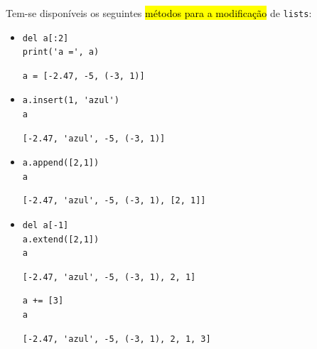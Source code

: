 Tem-se disponíveis os seguintes \hl{métodos para a modificação} de \texttt{lists}:
\begin{itemize}
\item {\PYTHONdel} 

\begin{lstlisting}[xrightmargin=2.5em]
del a[:2]
print('a =', a)
\end{lstlisting}

\begin{verbatim}
a = [-2.47, -5, (-3, 1)]
\end{verbatim}

\item {\PYTHONlistDOTinsert} 

\begin{lstlisting}[xrightmargin=2.5em]
a.insert(1, 'azul')
a
\end{lstlisting}

\begin{verbatim}
[-2.47, 'azul', -5, (-3, 1)]
\end{verbatim}

\item {\PYTHONlistDOTappend} 

\begin{lstlisting}[xrightmargin=2.5em]
a.append([2,1])
a
\end{lstlisting}

\begin{verbatim}
[-2.47, 'azul', -5, (-3, 1), [2, 1]]
\end{verbatim}

\item {\PYTHONlistDOTextend} 

\begin{lstlisting}[xrightmargin=2.5em]
del a[-1]
a.extend([2,1])
a
\end{lstlisting}

\begin{verbatim}
[-2.47, 'azul', -5, (-3, 1), 2, 1]
\end{verbatim}

\begin{lstlisting}
a += [3]
a
\end{lstlisting}

\begin{verbatim}
[-2.47, 'azul', -5, (-3, 1), 2, 1, 3]
\end{verbatim}

\end{itemize}

